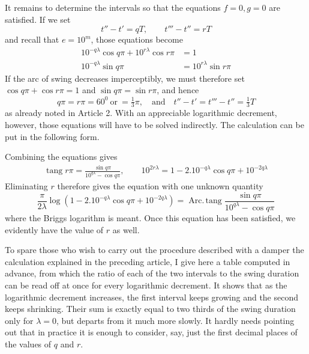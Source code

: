 It remains to determine the intervals so that the equations $f=0,g=0$ are satisfied. If we set
\[
t''-t'=qT,\qquad t'''-t''=rT
\]
and recall that $e=10^m$, those equations become
\[
\begin{aligned}
10^{-q\lambda}\cos q\pi+10^{r\lambda}\cos r\pi&=1\\
10^{-q\lambda}\sin q\pi&=10^{r\lambda}\sin r\pi
\end{aligned}
\]
If the arc of swing decreases imperceptibly, we must therefore set $\cos q\pi+\cos r\pi=1$ and $\sin q\pi=\sin r\pi$, and hence
\[
q\pi=r\pi=60^0\ \text{or}\ =\tfrac{1}{3}\pi,\quad\text{and}\quad t''-t'=t'''-t''=\tfrac{1}{3}T
\]
as already noted in Article 2. With an appreciable logarithmic decrement, however, those equations will have to be solved indirectly. The calculation can be put in the following form.

Combining the equations gives
\[
\begin{gathered}
\operatorname{tang}r\pi=\frac{\sin q\pi}{10^{q\lambda}-\cos q\pi},\qquad
10^{2r\lambda}=1-2.10^{-q\lambda}\cos q\pi+10^{-2q\lambda}
\end{gathered}
\]
Eliminating $r$ therefore gives the equation with one unknown quantity
\[
\frac{\pi}{2\lambda}\log(1-2.10^{-q\lambda}\cos q\pi+10^{-2q\lambda})=\operatorname{Arc.\,tang}\frac{\sin q\pi}{10^{q\lambda}-\cos q\pi}
\]
where the Briggs logarithm is meant. Once this equation has been satisfied, we evidently have the value of $r$ as well.

To spare those who wish to carry out the procedure described with a damper the calculation explained in the preceding article, I give here a table computed in advance, from which the ratio of each of the two intervals to the swing duration can be read off at once for every logarithmic decrement. It shows that as the logarithmic decrement increases, the first interval keeps growing and the second keeps shrinking. Their sum is exactly equal to two thirds of the swing duration only for $\lambda=0$, but departs from it much more slowly. It hardly needs pointing out that in practice it is enough to consider, say, just the first decimal places of the values of $q$ and $r$.

